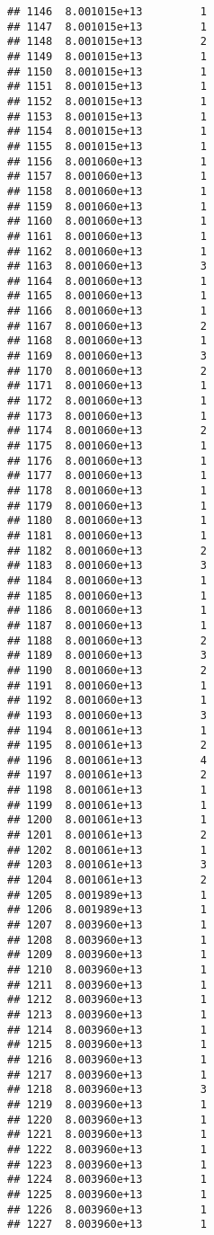 \documentclass[
]{article}
\begin{document}
\begin{verbatim}
## 1146  8.001015e+13         1
## 1147  8.001015e+13         1
## 1148  8.001015e+13         2
## 1149  8.001015e+13         1
## 1150  8.001015e+13         1
## 1151  8.001015e+13         1
## 1152  8.001015e+13         1
## 1153  8.001015e+13         1
## 1154  8.001015e+13         1
## 1155  8.001015e+13         1
## 1156  8.001060e+13         1
## 1157  8.001060e+13         1
## 1158  8.001060e+13         1
## 1159  8.001060e+13         1
## 1160  8.001060e+13         1
## 1161  8.001060e+13         1
## 1162  8.001060e+13         1
## 1163  8.001060e+13         3
## 1164  8.001060e+13         1
## 1165  8.001060e+13         1
## 1166  8.001060e+13         1
## 1167  8.001060e+13         2
## 1168  8.001060e+13         1
## 1169  8.001060e+13         3
## 1170  8.001060e+13         2
## 1171  8.001060e+13         1
## 1172  8.001060e+13         1
## 1173  8.001060e+13         1
## 1174  8.001060e+13         2
## 1175  8.001060e+13         1
## 1176  8.001060e+13         1
## 1177  8.001060e+13         1
## 1178  8.001060e+13         1
## 1179  8.001060e+13         1
## 1180  8.001060e+13         1
## 1181  8.001060e+13         1
## 1182  8.001060e+13         2
## 1183  8.001060e+13         3
## 1184  8.001060e+13         1
## 1185  8.001060e+13         1
## 1186  8.001060e+13         1
## 1187  8.001060e+13         1
## 1188  8.001060e+13         2
## 1189  8.001060e+13         3
## 1190  8.001060e+13         2
## 1191  8.001060e+13         1
## 1192  8.001060e+13         1
## 1193  8.001060e+13         3
## 1194  8.001061e+13         1
## 1195  8.001061e+13         2
## 1196  8.001061e+13         4
## 1197  8.001061e+13         2
## 1198  8.001061e+13         1
## 1199  8.001061e+13         1
## 1200  8.001061e+13         1
## 1201  8.001061e+13         2
## 1202  8.001061e+13         1
## 1203  8.001061e+13         3
## 1204  8.001061e+13         2
## 1205  8.001989e+13         1
## 1206  8.001989e+13         1
## 1207  8.003960e+13         1
## 1208  8.003960e+13         1
## 1209  8.003960e+13         1
## 1210  8.003960e+13         1
## 1211  8.003960e+13         1
## 1212  8.003960e+13         1
## 1213  8.003960e+13         1
## 1214  8.003960e+13         1
## 1215  8.003960e+13         1
## 1216  8.003960e+13         1
## 1217  8.003960e+13         1
## 1218  8.003960e+13         3
## 1219  8.003960e+13         1
## 1220  8.003960e+13         1
## 1221  8.003960e+13         1
## 1222  8.003960e+13         1
## 1223  8.003960e+13         1
## 1224  8.003960e+13         1
## 1225  8.003960e+13         1
## 1226  8.003960e+13         1
## 1227  8.003960e+13         1

\end{verbatim}
\end{document}
